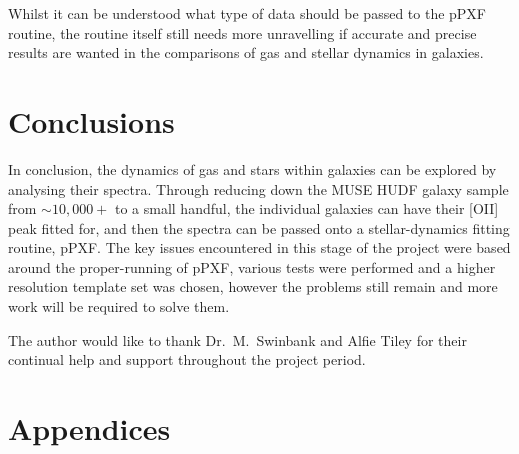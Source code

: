 \documentclass[12pt, twocolumn]{revtex4-1}    %
\begin{document}

Whilst it can be understood what type of data should be passed to the pPXF routine, the routine itself still needs more unravelling if accurate and precise results are wanted in the comparisons of gas and stellar dynamics in galaxies.


%

\vspace{2ex} %
\section{Conclusions}
\noindent
In conclusion, the dynamics of gas and stars within galaxies can be explored by analysing their spectra. Through reducing down the MUSE HUDF galaxy sample from $\sim10,000+$ to a small handful, the individual galaxies can have their [OII] peak fitted for, and then the spectra can be passed onto a stellar-dynamics fitting routine, pPXF. The key issues encountered in this stage of the project were based around the proper-running of pPXF, various tests were performed and a higher resolution template set was chosen, however the problems still remain and more work will be required to solve them.

\vspace{2ex} %
\begin{acknowledgments}
\noindent
The author would like to thank Dr.~M.~Swinbank and Alfie Tiley for their continual help and support throughout the project period.
\end{acknowledgments}

\vspace{2ex} %



\clearpage

\appendix

\onecolumngrid
\section*{Appendices}
\end{document}
